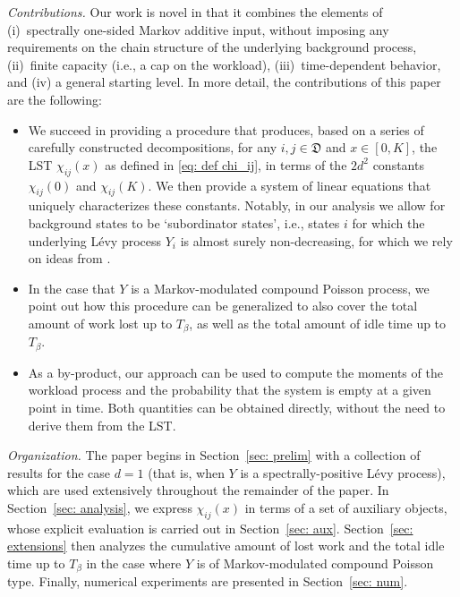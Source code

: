 \documentclass[reqno,12pt]{amsart}
\newcommand{\defD}{{\mathfrak D}}
\newcommand{\WS}[1]{{\color{blue}[WS: #1]}}
\begin{document}
{\it Contributions.} 
Our work is novel in that it combines the elements of (i)~spectrally one-sided Markov additive input, without imposing any requirements on the chain structure of the underlying background process, (ii)~finite capacity (i.e., a cap on the workload), (iii)~time-dependent behavior, and (iv) a general starting level. In more detail, the contributions of this paper are the following:
\begin{itemize}
    \item[$\circ$] We succeed in providing a procedure that produces,  based on a series of carefully constructed decompositions, for any $i,j\in\defD $ and $x\in[0, K]$, the LST
    $\chi_{ij}(x)$ as defined in \eqref{eq: def chi_ij}, in terms of the $2d^2$ constants $\chi_{ij}(0)$ and $\chi_{ij}(K)$.  We then provide a system of  linear equations that uniquely characterizes these constants. 
    Notably, in our analysis we allow for background states to be `subordinator states', i.e., states $i$ for which the underlying L\'evy process $Y_i$ is almost surely non-decreasing, for which we rely on ideas from \cite{MKD}. 
    \item[$\circ$] In the case that $Y$ is a Markov-modulated compound Poisson process, we point out how this procedure can be generalized to also cover the total amount of work lost up to $T_{\beta}$, as well as the total amount of idle time up to $T_{\beta}$.

    \item[$\circ$] As a by-product, our approach can be used to compute the moments of the workload process and the probability that the system is empty at a given point in time. Both quantities can be obtained directly, without the need to derive them from the LST.
\end{itemize}

{\it Organization.} The paper begins in Section~\ref{sec: prelim} with a collection of results for the case $d=1$ (that is, when $Y$ is a spectrally-positive L\'evy process), which are used extensively throughout the remainder of the paper. In Section~\ref{sec: analysis}, we express $\chi_{ij}(x)$ in terms of a set of auxiliary objects, whose explicit evaluation is carried out in Section~\ref{sec: aux}. Section~\ref{sec: extensions} then analyzes the cumulative amount of lost work and the total idle time up to $T_\beta$ in the case where $Y$ is of Markov-modulated compound Poisson type. Finally, numerical experiments are presented in Section~\ref{sec: num}.
\end{document}
